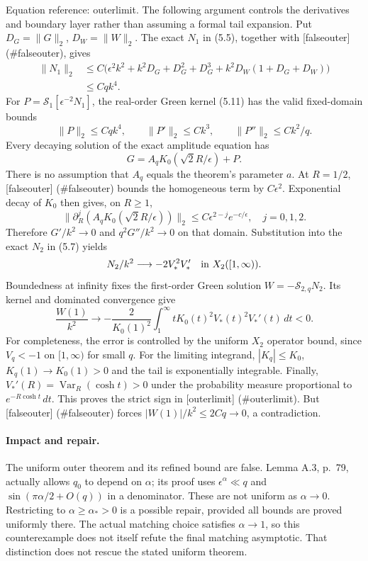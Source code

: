 \documentclass[10pt]{article}
\begin{document}
Equation reference: outerlimit. The following argument controls the derivatives and boundary layer rather than assuming a formal tail expansion. Put \(D_G=\|G\|_2\), \(D_W=\|W\|_2\). The exact \(N_1\) in (5.5), together with [falseouter] (\#falseouter), gives \[\begin{aligned}
 \|N_1\|_2
 &\le C\bigl(\epsilon^2k^2+k^2D_G+D_G^2+D_G^3
                     +k^2D_W(1+D_G+D_W)\bigr)\\
 &\le Cqk^4.\end{aligned}\] For \(P=\mathcal{S}_1[\epsilon^{-2}N_1]\), the real-order Green kernel (5.11) has the valid fixed-domain bounds \[\|P\|_2\le Cqk^4,\qquad
 \|P'\|_2\le Ck^3,\qquad
 \|P''\|_2\le Ck^2/q.\] Every decaying solution of the exact amplitude equation has \[G=A_qK_0(\sqrt2R/\epsilon)+P.\] There is no assumption that \(A_q\) equals the theorem’s parameter \(a\). At \(R=1/2\), [falseouter] (\#falseouter) bounds the homogeneous term by \(C\epsilon^2\). Exponential decay of \(K_0\) then gives, on \(R\ge1\), \[\|\partial_R^j(A_qK_0(\sqrt2R/\epsilon))\|_2
       \le C\epsilon^{2-j}e^{-c/\epsilon},\quad j=0,1,2.\] Therefore \(G'/k^2\to0\) and \(q^2G''/k^2\to0\) on that domain. Substitution into the exact \(N_2\) in (5.7) yields \[N_2/k^2\longrightarrow -2V_*^2V_*'
          \quad\hbox{in }X_2([1,\infty)).\] Boundedness at infinity fixes the first-order Green solution \(W=-\mathcal{S}_{2,q}N_2\). Its kernel and dominated convergence give \[
 \frac{W(1)}{k^2}\longrightarrow
 -\frac{2}{K_0(1)^2}\int_1^\infty
 tK_0(t)^2 V_*(t)^2V_*'(t)\,dt<0.\] For completeness, the error is controlled by the uniform \(X_2\) operator bound, since \(V_q<-1\) on \([1,\infty)\) for small \(q\). For the limiting integrand, \(|K_q|\le K_0\), \(K_q(1)\to K_0(1)>0\) and the tail is exponentially integrable. Finally, \(V_*'(R)=\mathop{\mathrm{Var}}_R(\cosh t)>0\) under the probability measure proportional to \(e^{-R\cosh t}\,dt\). This proves the strict sign in [outerlimit] (\#outerlimit). But [falseouter] (\#falseouter) forces \(|W(1)|/k^2\le2Cq\to0\), a contradiction.\par
\paragraph*{Impact and repair.}\mbox{}\par
The uniform outer theorem and its refined bound are false. Lemma A.3, p. 79, actually allows \(q_0\) to depend on \(\alpha\); its proof uses \(\epsilon^\alpha\ll q\) and \(\sin(\pi\alpha/2+O(q))\) in a denominator. These are not uniform as \(\alpha\to0\). Restricting to \(\alpha\ge\alpha_*>0\) is a possible repair, provided all bounds are proved uniformly there. The actual matching choice satisfies \(\alpha\to1\), so this counterexample does not itself refute the final matching asymptotic. That distinction does not rescue the stated uniform theorem.\par
\end{document}
